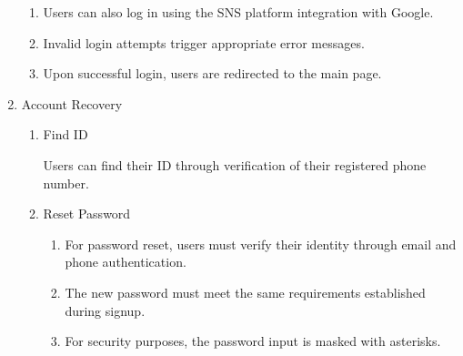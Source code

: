 \documentclass[conference]{IEEEtran}
\begin{document}
\begin{enumerate}[label=\arabic*]
\begin{enumerate}[label=\arabic*)]
        \item Users can also log in using the SNS platform integration with Google. 

        \vspace{0.5em}

        \item Invalid login attempts trigger appropriate error messages. 

        \vspace{0.5em}

        \item Upon successful login, users are redirected to the main page.
        
    \end{enumerate}

    \vspace{1em}

    \item Account Recovery\par
    \vspace{0.3em}

    \begin{enumerate}[label=\arabic*)]
        \item Find ID\par
        \vspace{0.3em}
        Users can find their ID through verification of their registered phone number.

        \vspace{0.5em}

        \item Reset Password\par
        \vspace{0.3em}

        \begin{enumerate}[label=\alph*)]
            \item For password reset, users must verify their identity through email and phone authentication.

            \vspace{0.5em}

            \item The new password must meet the same requirements established during signup.

            \vspace{0.5em}

            \item For security purposes, the password input is masked with asterisks.
        \end{enumerate}
    \end{enumerate}
\end{enumerate}
\end{document}

